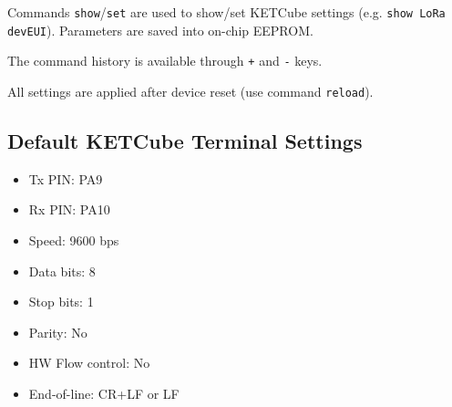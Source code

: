 Commands {\tt show}/{\tt set} are used to show/set KETCube settings (e.g. {\tt show LoRa devEUI}). Parameters are saved into on-chip EEPROM.

The command history is available through {\tt +} and {\tt -} keys.

All settings are applied after device reset (use command {\tt reload}).


\clearpage 

\subsection{Default KETCube Terminal Settings}

\begin{itemize}
  \item Tx PIN: PA9
  \item Rx PIN: PA10
  \item Speed: 9600 bps
  \item Data bits: 8
  \item Stop bits: 1
  \item Parity: No
  \item HW Flow control: No
  \item End-of-line: CR+LF or LF
\end{itemize}






\clearpage





